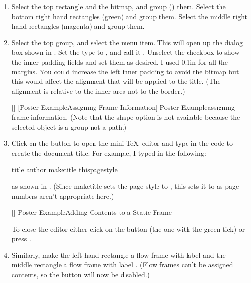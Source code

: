 \begin{enumerate}
\FloatFig
{fig:poster4}
[]
{}
{Poster Example\dash Adding Some Paint}

\item Select the top rectangle and the \gls{bitmap}, and
\gls{group} () them.
Select the bottom right hand rectangles (green) and group them.
Select the middle right hand rectangles (magenta) and group them.

\item Select the top group, and select the
 menu item. This will open up the
 dialog box shown in .  Set
the type to , and call it .
Unselect the  checkbox to show the
inner padding fields and set them as desired.  I used 0.1in for all
the margins. You could increase the left inner padding to avoid the
\gls{bitmap} but this would affect the  alignment
that will be applied to the title.  (The alignment is relative to
the inner area not to the border.)

[]
{}
[Poster Example\dash Assigning Frame Information]
{Poster Example\dash assigning frame information. (Note that
the shape option is not available because the selected object is
a group not a path.)}

\item Click on the  button to open
the mini \TeX\ editor and type in the code to create the document
title. For example, I typed in the following:
\begin{compactcodebox*}
\gls{title}
\gls{author}
\gls{maketitle}
\gls{thispagestyle}
\end{compactcodebox*}
as shown in . (Since
\gls{maketitle} sets the page style to , this sets
it to  as page numbers aren't appropriate here.)

[]
{}
{Poster Example\dash Adding Contents to a Static Frame}

To close the editor either click on the 
button (the one with the green tick) or press 
.

\item Similarly, make the left hand rectangle a flow frame
with label  and the middle rectangle a flow frame with label
. (Flow frames can't be assigned contents, so the
 button will now be disabled.)


\end{enumerate}
